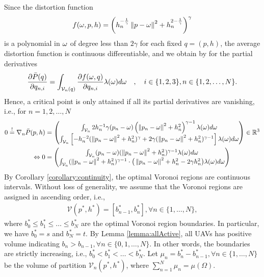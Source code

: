\documentclass[smallabstract,smallcaptions]{dccpaper}
\newcommand{\df}{\ensuremath{\lam}}         %
\newcommand{\bQ}{\ensuremath{q}}          %
\newcommand{\Pbar}{\ensuremath{\bar{P}}}         %
\newcommand{\Vor}{\ensuremath{\mathcal{V}}}         %
\begin{document}
Since the distortion function 
\begin{align}
  f(\omega,p,h)= \left(h_n^{-\frac{1}{\gamma}} \left\|p-\omega\right\| ^2 + h_n^{2-\frac{1}{\gamma}}\right)^{\gamma}
\end{align}  
is a polynomial in $\omega$ of degree less than $2\gamma$ for each fixed $\bQ=(p,h)$, the average distortion function is continuous
differentiable, and we obtain by \cite[Thm.1]{WJ18} for the partial derivatives 
%
\begin{align}
  \frac{\partial \Pbar(q)}{\partial q_{n,i}} = \int_{\Vor_n(q)} \frac{\partial f(\ome,q)}{\partial q_{n,i}}
  \df(\ome)d\ome\quad,\quad i\in\{1,2,3\},n\in\{1,2,\dots,N\}.
\end{align}
%
Hence, a critical point is only attained if all its partial derivatives are vanishing, i.e.,  for  $n=1,2,\dots,N$ 
%
\begin{align}
 0\overset{!}{=} \nabla_n \Pbar(p,h) &= \begin{pmatrix} 
   \int_{\Vor_n} 2h_n^{-1} \gam (p_{n}-\ome)  \left(\Norm{p_n-\ome}^2 +h_n^2\right)^{\gam-1} 
    \df(\ome)d \ome\\
    \int_{\Vor_n} \left[-h_n^{-2}(\Norm{p_n-\ome}^2 + h_n^2)^{\gam} + 2\gam 
    (\Norm{p_n-\ome}^2 +h_n^2)^{\gam-1}\right]
    \df(\ome)d \ome
  \end{pmatrix} \in\R^3\notag\\
\LRA 0&= \begin{pmatrix}
  \int_{\Vor_n} (p_{n}-\ome) (\Norm{p_n-\ome}^2 +h_n^2)^{\gam-1} \df(\ome)d \ome\\
  \int_{\Vor_n} (\Norm{p_n-\ome}^2 +h_n^2)^{\gam-1}\cdot \big(\Norm{p_n-\ome}^2+h_n^2 - 2\gam h_n^2 \big)
  \df(\ome)d \ome
  \end{pmatrix}\label{eq:gradient}
\end{align}
%
By Corollary \ref{corollary:continuity}, the optimal Voronoi regions are continuous intervals. 
Without loss of generality, we assume that the Voronoi regions are assigned in ascending order, i.e., 
\begin{align}
\Vor(p^*, h^*)=[b^*_{n-1}, b^*_n], \forall n\in\{1,\dots,N\},
\label{eq:1DoptV}
\end{align}
where $b^*_0\le b^*_1\le\dots\le b^*_N$ are the optimal Voronoi region boundaries. In particular, we have $b^*_0=s$ and $b^*_N=t$.
By Lemma \ref{lemma:allActive}, all UAVs has positive volume indicating $b_n > b_{n-1}, \forall n\in\{0,1,\dots,N\}$.
In other words, the boundaries are strictly increasing, i.e., $b^*_0< b^*_1<\dots< b^*_N$.
Let $\mu_n=b^*_n-b^*_{n-1}, \forall n\in\{1,\dots,N\}$ be the volume of partition $\Vor_n(p^*, h^*)$, where $\sum_{n=1}^{N}\mu_n=\mu(\Omega)$.
\end{document}
